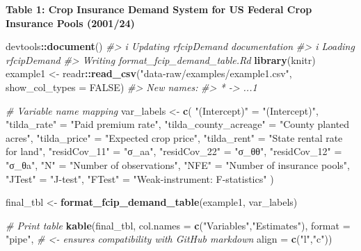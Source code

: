 \documentclass[
]{article}
\newenvironment{Shaded}{\begin{snugshade}}{\end{snugshade}}
\newcommand{\AttributeTok}[1]{\textcolor[rgb]{0.13,0.29,0.53}{#1}}
\newcommand{\CommentTok}[1]{\textcolor[rgb]{0.56,0.35,0.01}{\textit{#1}}}
\newcommand{\ConstantTok}[1]{\textcolor[rgb]{0.56,0.35,0.01}{#1}}
\newcommand{\FunctionTok}[1]{\textcolor[rgb]{0.13,0.29,0.53}{\textbf{#1}}}
\newcommand{\NormalTok}[1]{#1}
\newcommand{\OtherTok}[1]{\textcolor[rgb]{0.56,0.35,0.01}{#1}}
\newcommand{\SpecialCharTok}[1]{\textcolor[rgb]{0.81,0.36,0.00}{\textbf{#1}}}
\newcommand{\StringTok}[1]{\textcolor[rgb]{0.31,0.60,0.02}{#1}}
\begin{document}
\textbf{Table 1: Crop Insurance Demand System for US Federal Crop
Insurance Pools (2001/24)}

\begin{Shaded}
\begin{Highlighting}[]
\NormalTok{devtools}\SpecialCharTok{::}\FunctionTok{document}\NormalTok{()}
\CommentTok{\#\textgreater{} i Updating rfcipDemand documentation}
\CommentTok{\#\textgreater{} i Loading rfcipDemand}
\CommentTok{\#\textgreater{} Writing \textquotesingle{}format\_fcip\_demand\_table.Rd\textquotesingle{}}
\FunctionTok{library}\NormalTok{(knitr)}
\NormalTok{example1 }\OtherTok{\textless{}{-}}\NormalTok{ readr}\SpecialCharTok{::}\FunctionTok{read\_csv}\NormalTok{(}\StringTok{"data{-}raw/examples/example1.csv"}\NormalTok{, }\AttributeTok{show\_col\_types =} \ConstantTok{FALSE}\NormalTok{)}
\CommentTok{\#\textgreater{} New names:}
\CommentTok{\#\textgreater{} * \textasciigrave{}\textasciigrave{} {-}\textgreater{} \textasciigrave{}...1\textasciigrave{}}

\CommentTok{\# Variable name mapping}
\NormalTok{var\_labels }\OtherTok{\textless{}{-}} \FunctionTok{c}\NormalTok{(}
  \StringTok{"(Intercept)"}            \OtherTok{=} \StringTok{"(Intercept)"}\NormalTok{,}
  \StringTok{"tilda\_rate"}             \OtherTok{=} \StringTok{"Paid premium rate"}\NormalTok{,}
  \StringTok{"tilda\_county\_acreage"}   \OtherTok{=} \StringTok{"County planted acres"}\NormalTok{,}
  \StringTok{"tilda\_price"}            \OtherTok{=} \StringTok{"Expected crop price"}\NormalTok{,}
  \StringTok{"tilda\_rent"}             \OtherTok{=} \StringTok{"State rental rate for land"}\NormalTok{,}
  \StringTok{"residCov\_11"}            \OtherTok{=} \StringTok{"σ\_aa"}\NormalTok{,}
  \StringTok{"residCov\_22"}            \OtherTok{=} \StringTok{"σ\_θθ"}\NormalTok{,}
  \StringTok{"residCov\_12"}            \OtherTok{=} \StringTok{"σ\_θa"}\NormalTok{,}
  \StringTok{"N"}                      \OtherTok{=} \StringTok{"Number of observations"}\NormalTok{,}
  \StringTok{"NFE"}                    \OtherTok{=} \StringTok{"Number of insurance pools"}\NormalTok{,}
  \StringTok{"JTest"}                  \OtherTok{=} \StringTok{"J{-}test"}\NormalTok{,}
  \StringTok{"FTest"}                  \OtherTok{=} \StringTok{"Weak{-}instrument: F{-}statistics"}
\NormalTok{)}

\NormalTok{final\_tbl }\OtherTok{\textless{}{-}} \FunctionTok{format\_fcip\_demand\_table}\NormalTok{(example1, var\_labels)}

\CommentTok{\# Print table}
\FunctionTok{kable}\NormalTok{(final\_tbl,}
      \AttributeTok{col.names =} \FunctionTok{c}\NormalTok{(}\StringTok{"Variables"}\NormalTok{,}\StringTok{"Estimates"}\NormalTok{),}
      \AttributeTok{format =} \StringTok{"pipe"}\NormalTok{,  }\CommentTok{\# \textless{}{-} ensures compatibility with GitHub markdown}
      \AttributeTok{align =} \FunctionTok{c}\NormalTok{(}\StringTok{"l"}\NormalTok{,}\StringTok{"c"}\NormalTok{))}
\end{Highlighting}
\end{Shaded}
\end{document}
